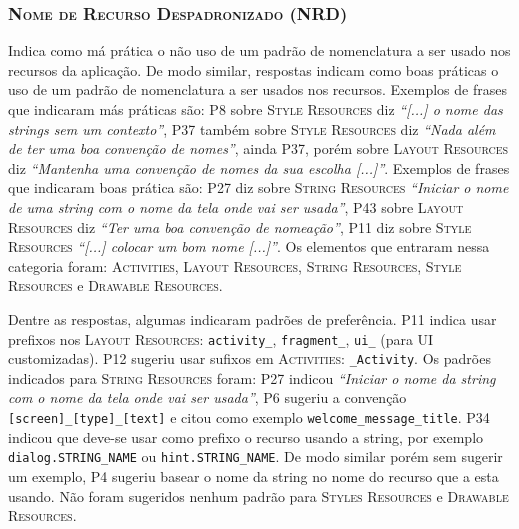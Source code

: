 \subsubsection{\textsc{Nome de Recurso Despadronizado (NRD)}}
Indica como má prática o não uso de um padrão de nomenclatura a ser usado nos recursos da aplicação. De modo similar, respostas indicam como boas práticas o uso de um padrão de nomenclatura a ser usados nos recursos. Exemplos de frases que indicaram más práticas são: P8 sobre \textsc{Style Resources} diz \textit{``[...] o nome das strings sem um contexto''}, P37 também sobre \textsc{Style Resources} diz \textit{``Nada além de ter uma boa convenção de nomes''}, ainda P37, porém sobre \textsc{Layout Resources} diz \textit{``Mantenha uma convenção de nomes da sua escolha [...]''}. Exemplos de frases que indicaram boas prática são: P27 diz sobre \textsc{String Resources} \textit{``Iniciar o nome de uma string com o nome da tela onde vai ser usada''}, P43 sobre \textsc{Layout Resources} diz \textit{``Ter uma boa convenção de nomeação''}, P11 diz sobre \textsc{Style Resources} \textit{``[...] colocar um bom nome [...]''}. Os elementos que entraram nessa categoria foram: \textsc{Activities}, \textsc{Layout Resources}, \textsc{String Resources}, \textsc{Style Resources} e \textsc{Drawable Resources}. 

Dentre as respostas, algumas indicaram padrões de preferência. P11 indica usar prefixos nos \textsc{Layout Resources}: \texttt{activity\_}, \texttt{fragment\_}, \texttt{ui\_} (para UI customizadas). P12 sugeriu usar sufixos em \textsc{Activities}: \texttt{\_Activity}. Os padrões indicados para \textsc{String Resources} foram: P27 indicou \textit{``Iniciar o nome da string com o nome da tela onde vai ser usada''}, P6 sugeriu a convenção \texttt{[screen]\_[type]\_[text]} e citou como exemplo \texttt{welcome\_message\_title}. P34 indicou que deve-se usar como prefixo o recurso usando a string, por exemplo \texttt{dialog.STRING\_NAME} ou \texttt{hint.STRING\_NAME}. De modo similar porém sem sugerir um exemplo, P4 sugeriu basear o nome da string no nome do recurso que a esta usando. Não foram sugeridos nenhum padrão para \textsc{Styles Resources} e \textsc{Drawable Resources}.

